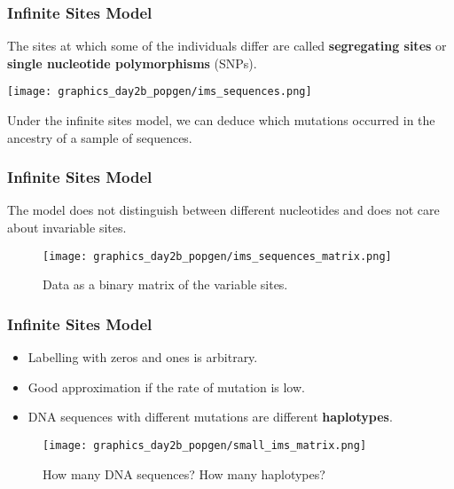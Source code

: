 \documentclass{beamer}
\newcommand{\1}{\ensuremath{\mathbf{1}}}
\begin{document}
%
%
%
\begin{frame}\frametitle{Infinite Sites Model}
	The sites at which some of the individuals differ are called \textbf{segregating sites} or \textbf{single nucleotide polymorphisms} (SNPs).
	\begin{center}
		\texttt{[image: graphics\_day2b\_popgen/ims\_sequences.png]}
	\end{center}
	Under the infinite sites model, we can deduce which mutations occurred in the ancestry of a sample of sequences.
\end{frame}
%
%
%
\begin{frame}\frametitle{Infinite Sites Model}
	The model does not distinguish between different nucleotides and does not care about invariable sites.
	\begin{figure}
	\begin{center}
		\texttt{[image: graphics\_day2b\_popgen/ims\_sequences\_matrix.png]}
	\end{center}
	\caption{Data as a binary matrix of the variable sites.}
	\end{figure}
\end{frame}
%
%
%
\begin{frame}\frametitle{Infinite Sites Model}
	\begin{itemize}
		\item Labelling with zeros and ones is arbitrary.
		\item Good approximation if the rate of mutation is low.
		\item DNA sequences with different mutations are different \textbf{haplotypes}.
	\end{itemize}
	\begin{figure}
	\begin{center}
		\texttt{[image: graphics\_day2b\_popgen/small\_ims\_matrix.png]}
	\end{center}
	\caption{How many DNA sequences? How many haplotypes?}
	\end{figure}
\end{frame}
\end{document}
